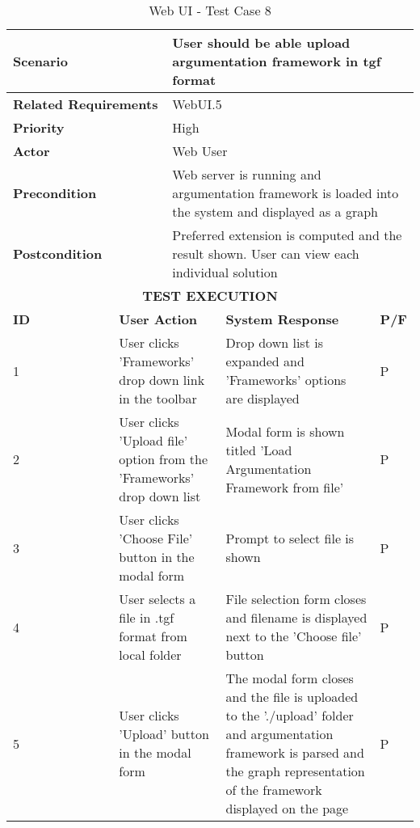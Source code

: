 \begin{longtable}[c]{p{}|p{}|p{}|p{}|p{}}
	\caption{Web UI - Test Case 8}
	\label{table:testcase8} \\
	\hline
	\multicolumn{2}{p{0.3\textwidth}}{\textbf{Scenario}} & \multicolumn{3}{p{0.6\textwidth}}{User should be able upload argumentation framework in tgf format} \\ 
	\hline
	\endfirsthead
	\endhead
	\multicolumn{2}{p{0.3\textwidth}}{\textbf{Related Requirements}} & \multicolumn{3}{p{0.6\textwidth}}{WebUI.5} \\ 
	\hline
	\multicolumn{2}{p{0.3\textwidth}}{\textbf{Priority}} & \multicolumn{3}{p{0.6\textwidth}}{High} \\ 
	\hline
	\multicolumn{2}{p{0.3\textwidth}}{\textbf{Actor}} & \multicolumn{3}{p{0.6\textwidth}}{Web User} \\ 
	\hline
	\multicolumn{2}{p{0.3\textwidth}}{\textbf{Precondition}} & \multicolumn{3}{p{0.6\textwidth}}{Web server is running and argumentation framework is loaded into the system and displayed as a graph} \\ 
	\hline
	\multicolumn{2}{p{0.3\textwidth}}{\textbf{Postcondition}} & \multicolumn{3}{p{0.6\textwidth}}{Preferred extension is computed and the result shown. User can view each individual solution} \\ 
	\hline
	\multicolumn{5}{c}{\cellcolor{grey}\textbf{TEST EXECUTION}} \\ 
	\hline
	\textbf{ID} & \multicolumn{2}{|p{0.4\textwidth}|}{\textbf{User Action}} & \textbf{System Response} & \textbf{P/F} \\ 
	\hline
	1 & \multicolumn{2}{|p{0.4\textwidth}|}{User clicks 'Frameworks' drop down link in the toolbar} & Drop down list is expanded and 'Frameworks' options are displayed & P \\ 
	\hline
	2 & \multicolumn{2}{|p{0.4\textwidth}|}{User clicks 'Upload file' option from the 'Frameworks' drop down list } & Modal form is shown titled 'Load Argumentation Framework from file' & P \\ 
	\hline
	3 & \multicolumn{2}{|p{0.4\textwidth}|}{User clicks 'Choose File' button in the modal form } & Prompt to select file is shown & P \\ 
	\hline
	4 & \multicolumn{2}{|p{0.4\textwidth}|}{User selects a file in .tgf format from local folder } & File selection form closes and filename is displayed next to the 'Choose file' button & P \\ 
	\hline
	5 & \multicolumn{2}{|p{0.4\textwidth}|}{User clicks 'Upload' button in the modal form } & The modal form closes and the file is uploaded to the './upload' folder and argumentation framework is parsed and the graph representation of the framework displayed on the page & P \\ 
	\hline
\end{longtable}